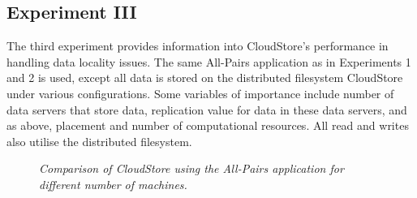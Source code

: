 \documentclass{rspublic}
\begin{document}
\subsection{Experiment III} The third experiment provides information
into CloudStore's performance in handling data locality issues.  The
same All-Pairs application as in Experiments 1 and 2 is used, except all
data is stored on the distributed filesystem CloudStore under various
configurations.  Some variables of importance include number of data
servers that store data, replication value for data in these data
servers, and as above, placement and number of computational resources.
All read and writes also utilise the distributed filesystem.  
\begin{center}
\begin{figure}
\caption{\textit{Comparison of CloudStore using the All-Pairs
application for different number of machines.}}
\label{experiment3}
\end{figure}
\end{center}
\end{document}
